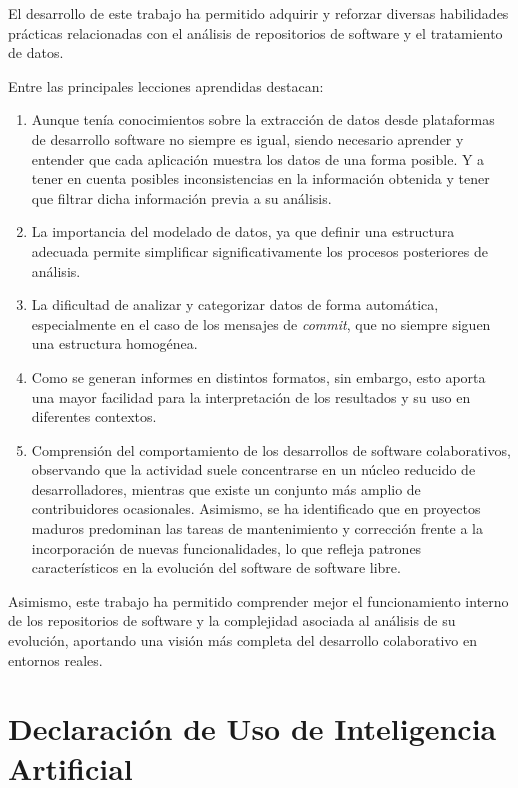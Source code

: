\documentclass[a4paper, 12pt]{book}
\begin{document}
El desarrollo de este trabajo ha permitido adquirir y reforzar diversas habilidades prácticas relacionadas con el análisis de repositorios de software y el tratamiento de datos.

Entre las principales lecciones aprendidas destacan:

\begin{enumerate}
    \item Aunque tenía conocimientos sobre la extracción de datos desde plataformas de desarrollo software no siempre es igual, siendo necesario aprender y entender que cada aplicación muestra los datos de una forma posible. Y a tener en cuenta posibles inconsistencias en la información obtenida y tener que filtrar dicha información previa a su análisis.
    
    \item La importancia del modelado de datos, ya que definir una estructura adecuada permite simplificar significativamente los procesos posteriores de análisis.
    
    \item La dificultad de analizar y categorizar datos de forma automática, especialmente en el caso de los mensajes de \emph{commit}, que no siempre siguen una estructura homogénea.
    
    \item Como se generan informes en distintos formatos, sin embargo, esto aporta una mayor facilidad para la interpretación de los resultados y su uso en diferentes contextos.
    
    \item Comprensión del comportamiento de los desarrollos de software colaborativos, observando que la actividad suele concentrarse en un núcleo reducido de desarrolladores, mientras que existe un conjunto más amplio de contribuidores ocasionales. Asimismo, se ha identificado que en proyectos maduros predominan las tareas de mantenimiento y corrección frente a la incorporación de nuevas funcionalidades, lo que refleja patrones característicos en la evolución del software de software libre.
    
\end{enumerate}

Asimismo, este trabajo ha permitido comprender mejor el funcionamiento interno de los repositorios de software y la complejidad asociada al análisis de su evolución, aportando una visión más completa del desarrollo colaborativo en entornos reales.

\section{Declaración de Uso de Inteligencia Artificial}
\label{sec:uso_ia}
\end{document}
